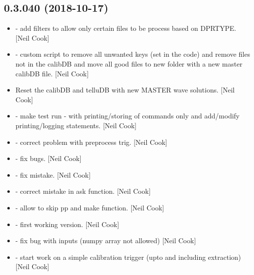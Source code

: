 \documentclass[a4paper,10pt,english]{report}
\begin{document}
\subsection{0.3.040 (2018-10-17)}
\label{\detokenize{misc/changelog:id290}}\begin{itemize}
\item {} 
 - add filters to allow only certain files to be
process based on DPRTYPE. {[}Neil Cook{]}

\item {} 
 - custom script to remove all unwanted keys (set in the
code) and remove files not in the calibDB and move all good files to
new folder with a new master calibDB file. {[}Neil Cook{]}

\item {} 
Reset the calibDB and telluDB with new MASTER wave solutions. {[}Neil
Cook{]}

\item {} 
 - make test run - with printing/storing of commands
only and add/modify printing/logging statements. {[}Neil Cook{]}

\item {} 
 - correct problem with preprocess trig. {[}Neil Cook{]}

\item {} 
 - fix bugs. {[}Neil Cook{]}

\item {} 
 - fix mistake. {[}Neil Cook{]}

\item {} 
 - correct mistake in ask function. {[}Neil Cook{]}

\item {} 
 - allow to skip pp and make function. {[}Neil Cook{]}

\item {} 
 - first working version. {[}Neil Cook{]}

\item {} 
 - fix bug with inputs (numpy array not allowed) {[}Neil
Cook{]}

\item {} 
 - start work on a simple calibration trigger (upto
and including extraction) {[}Neil Cook{]}

\end{itemize}
\end{document}
